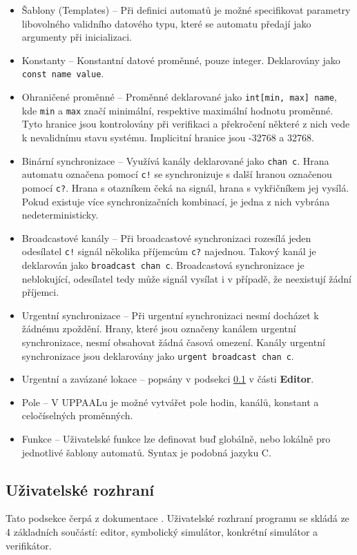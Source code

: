 \begin{itemize}
    \item Šablony (Templates) -- Při definici automatů je možné specifikovat parametry libovolného validního datového typu, které se automatu předají jako argumenty při inicializaci.
    \item Konstanty -- Konstantní datové proměnné, pouze integer. Deklarovány jako \texttt{const name value}.
    \item Ohraničené proměnné -- Proměnné deklarované jako \texttt{int[min, max] name}, kde \texttt{min} a \texttt{max} značí minimální, respektive maximální hodnotu proměnné. Tyto hranice jsou kontrolovány při verifikaci a překročení některé z nich vede k nevalidnímu stavu systému. Implicitní hranice jsou -32768 a 32768.
    \item Binární synchronizace -- Využívá kanály deklarované jako \texttt{chan c}. Hrana automatu označena pomocí \texttt{c!} se synchronizuje s další hranou označenou pomocí \texttt{c?}. Hrana s otazníkem čeká na signál, hrana s vykřičníkem jej vysílá. Pokud existuje více synchronizačních kombinací, je jedna z nich vybrána nedeterministicky.
    \item Broadcastové kanály -- Při broadcastové synchronizaci rozesílá jeden odesílatel \texttt{c!} signál několika příjemcům \texttt{c?} najednou. Takový kanál je deklarován jako \texttt{broadcast chan c}. Broadcastová synchronizace je neblokující, odesílatel tedy může signál vysílat i v případě, že neexistují žádní příjemci.
    \item Urgentní synchronizace -- Při urgentní synchronizaci nesmí docházet k žádnému zpoždění. Hrany, které jsou označeny kanálem urgentní synchronizace, nesmí obsahovat žádná časová omezení. Kanály urgentní synchronizace jsou deklarovány jako \texttt{urgent broadcast chan c}.
    \item Urgentní a zavázané lokace -- popsány v podsekci \ref{uppaal_gui} v části \textbf{Editor}.
    \item Pole -- V UPPAALu je možné vytvářet pole hodin, kanálů, konstant a celočíselných proměnných.
    \item Funkce -- Uživatelské funkce lze definovat buď globálně, nebo lokálně pro jednotlivé šablony automatů. Syntax je podobná jazyku C.
\end{itemize}

\subsection{Uživatelské rozhraní} \label{uppaal_gui}
Tato podsekce čerpá z dokumentace \cite{uppaal_doc}. Uživatelské rozhraní programu se skládá ze 4 základních součástí: editor, symbolický simulátor, konkrétní simulátor a verifikátor.

